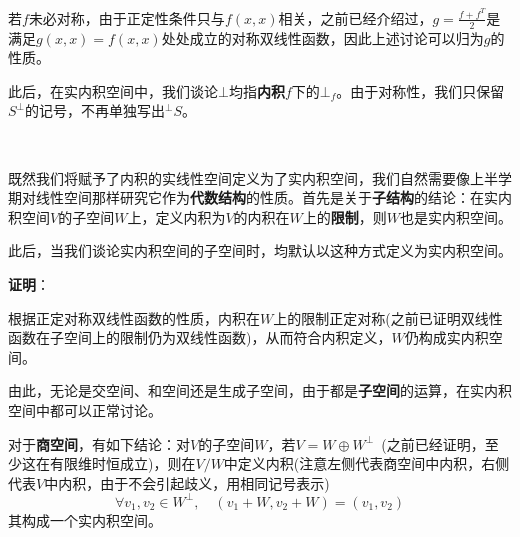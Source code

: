\documentclass[a4paper,UTF8,fontset=windows,AutoFakeBold]{ctexart}
\newcommand*{\note}{\noindent *}
\newcommand{\proo}[1]{{\vspace{5pt}\kaishu\noindent\textbf{证明}：\vspace{-3pt}
\begin{compactitem}
    \item[] #1
\end{compactitem}
}}
\begin{document}
\note 若$f$未必对称，由于正定性条件只与$f(x,x)$相关，之前已经介绍过，$g=\frac{f+f^T}{2}$是满足$g(x,x)=f(x,x)$处处成立的对称双线性函数，因此上述讨论可以归为$g$的性质。

\note 此后，在实内积空间中，我们谈论$\bot$均指\textbf{内积}$f$下的$\bot_f$。由于对称性，我们只保留$S^\bot$的记号，不再单独写出$^\bot S$。

\

既然我们将赋予了内积的实线性空间定义为了实内积空间，我们自然需要像上半学期对线性空间那样研究它作为\textbf{代数结构}的性质。首先是关于\textbf{子结构}的结论：在实内积空间$V$的子空间$W$上，定义内积为$V$的内积在$W$上的\textbf{限制}，则$W$也是实内积空间。

\note 此后，当我们谈论实内积空间的子空间时，均默认以这种方式定义为实内积空间。

\proo{
    根据正定对称双线性函数的性质，内积在$W$上的限制正定对称(之前已证明双线性函数在子空间上的限制仍为双线性函数)，从而符合内积定义，$W$仍构成实内积空间。
}

由此，无论是交空间、和空间还是生成子空间，由于都是\textbf{子空间}的运算，在实内积空间中都可以正常讨论。

对于\textbf{商空间}，有如下结论：对$V$的子空间$W$，若$V=W\oplus W^\bot$\ (之前已经证明，至少这在有限维时恒成立)，则在$V/W$中定义内积(注意左侧代表商空间中内积，右侧代表$V$中内积，由于不会引起歧义，用相同记号表示)
$$\forall v_1,v_2\in W^\bot,\quad(v_1+W,v_2+W)=(v_1,v_2)$$
其构成一个实内积空间。
\end{document}
